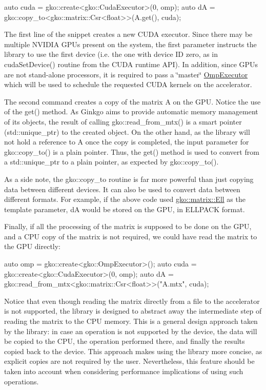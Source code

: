 \begin{DoxyCode}
\textcolor{keyword}{auto} cuda = gko::create<gko::CudaExecutor>(0, omp);
\textcolor{keyword}{auto} dA = gko::copy\_to<gko::matrix::Csr<float>>(A.get(), cuda);
\end{DoxyCode}


The first line of the snippet creates a new C\+U\+DA executor. Since there may be multiple N\+V\+I\+D\+IA G\+P\+Us present on the system, the first parameter instructs the library to use the first device (i.\+e. the one with device ID zero, as in cuda\+Set\+Device() routine from the C\+U\+DA runtime A\+PI). In addition, since G\+P\+Us are not stand-\/alone processors, it is required to pass a \char`\"{}master\char`\"{} \hyperlink{classgko_1_1OmpExecutor}{Omp\+Executor} which will be used to schedule the requested C\+U\+DA kernels on the accelerator.

The second command creates a copy of the matrix A on the G\+PU. Notice the use of the get() method. As Ginkgo aims to provide automatic memory management of its objects, the result of calling gko\+::read\+\_\+from\+\_\+mtx() is a smart pointer (std\+::unique\+\_\+ptr) to the created object. On the other hand, as the library will not hold a reference to A once the copy is completed, the input parameter for gko\+::copy\+\_\+to() is a plain pointer. Thus, the get() method is used to convert from a std\+::unique\+\_\+ptr to a plain pointer, as expected by gko\+::copy\+\_\+to().

As a side note, the gko\+::copy\+\_\+to routine is far more powerful than just copying data between different devices. It can also be used to convert data between different formats. For example, if the above code used \hyperlink{classgko_1_1matrix_1_1Ell}{gko\+::matrix\+::\+Ell} as the template parameter, dA would be stored on the G\+PU, in E\+L\+L\+P\+A\+CK format.

Finally, if all the processing of the matrix is supposed to be done on the G\+PU, and a C\+PU copy of the matrix is not required, we could have read the matrix to the G\+PU directly\+:


\begin{DoxyCode}
\textcolor{keyword}{auto} omp = gko::create<gko::OmpExecutor>();
\textcolor{keyword}{auto} cuda = gko::create<gko::CudaExecutor>(0, omp);
\textcolor{keyword}{auto} dA = gko::read\_from\_mtx<gko::matrix::Csr<float>>(\textcolor{stringliteral}{"A.mtx"}, cuda);
\end{DoxyCode}
 Notice that even though reading the matrix directly from a file to the accelerator is not supported, the library is designed to abstract away the intermediate step of reading the matrix to the C\+PU memory. This is a general design approach taken by the library\+: in case an operation is not supported by the device, the data will be copied to the C\+PU, the operation performed there, and finally the results copied back to the device. This approach makes using the library more concise, as explicit copies are not required by the user. Nevertheless, this feature should be taken into account when considering performance implications of using such operations. 

